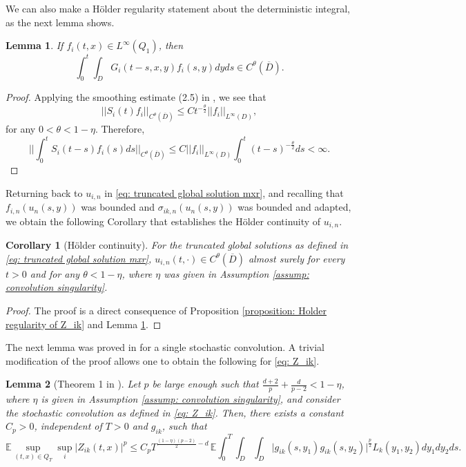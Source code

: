 \documentclass[12pt]{article}
\newtheorem{lemma}{Lemma}
\newtheorem{corollary}{Corollary}[section]
\theoremstyle{definition}
\theoremstyle{remark}
\begin{document}
We can also make a H\"older regularity statement about the deterministic integral, as the next lemma shows.
\begin{lemma}\label{Lemma: Holder regularity of deterministic integral}
    If $f_i(t,x)\in L^{\infty}(Q_1)$, then
    \[
    \int_0^t\int_D G_i(t-s,x,y)f_i(s,y)dyds\in C^{\theta}(\overline{D}).
    \]
\end{lemma}
\begin{proof}
    Applying the smoothing estimate (2.5) in \cite{cerrai2003stochastic}, we see that
    \[    ||S_i(t)f_i||_{C^{\theta}(\overline{D})} \leq Ct^{-\frac{\theta}{2}}||f_i||_{L^{\infty}(D)},
    \]
    for any $0<\theta<1-\eta$. Therefore,
\begin{equation}\label{eq: determ smoothing}
\Bigg|\Bigg| \int_0^t S_i(t-s)f_i(s)ds\Bigg|\Bigg|_{C^{\theta}(\overline{D})} \leq C||f_i||_{L^{\infty}(D)}\int_0^t (t-s)^{-\frac{\theta}{2}}ds<\infty.
\end{equation}
\end{proof}
Returning back to $u_{i,n}$ in \eqref{eq: truncated global solution mxr}, and recalling that $f_{i,n}(u_n(s,y))$ was bounded and $\sigma_{ik,n}(u_n(s,y))$ was bounded and adapted, we obtain the following Corollary that establishes the H\"older continuity of $u_{i,n}$.
\begin{corollary}[H\"older continuity]
    For the truncated global solutions as defined in \eqref{eq: truncated global solution mxr}, $u_{i,n}(t,\cdot)\in C^{\theta}(\overline{D})$ almost surely for every $t>0$ and for any $\theta<1-\eta$, where $\eta$ was given in Assumption \ref{assump: convolution singularity}.
\end{corollary}
\begin{proof}
    The proof is a direct consequence of Proposition \ref{proposition: Holder regularity of Z_ik} and Lemma \ref{Lemma: Holder regularity of deterministic integral}.
\end{proof}
The next lemma was proved in \cite{salins2025nonexplosion} for a single stochastic convolution. A trivial modification of the proof allows one to obtain the following for \eqref{eq: Z_ik}.
\begin{lemma}[Theorem 1 in \cite{salins2025nonexplosion}]\label{lemma: sup norm Z}
    Let $p$ be large enough such that $\frac{d+2}{p} + \frac{d}{p-2} < 1-\eta$, where $\eta$ is given in Assumption \ref{assump: convolution singularity}, and consider the stochastic convolution as defined in \eqref{eq: Z_ik}. Then, there exists a constant $C_p>0$, independent of $T>0$ and $g_{ik}$, such that
\begin{equation}\label{eq: sup norm Z}
\mathbb{E}\sup_{(t,x)\in Q_T}\sup_{i}\bigl|Z_{ik}(t,x)\bigr|^p\leq C_p
T^{\frac{(1-\eta)(p-2)}{2}-d}\,
\mathbb{E}
\int_0^T\int_D\int_D \bigl|g_{ik}(s,y_1)g_{ik}(s,y_2)\bigr|^{\frac{p}{2}} L_k(y_1,y_2)dy_1dy_2ds.
\end{equation}
\end{lemma}
\end{document}
